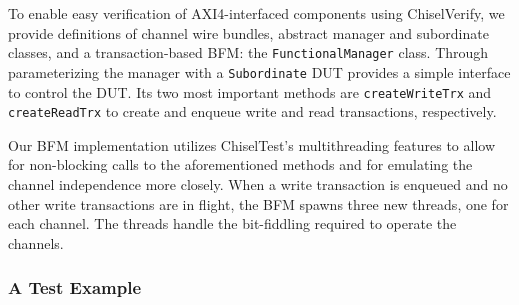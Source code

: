 \documentclass[conference]{IEEEtran}
\begin{document}
To enable easy verification of AXI4-interfaced components using ChiselVerify, we provide definitions of channel wire bundles, abstract manager and subordinate classes, and a transaction-based BFM: the \texttt{FunctionalManager} class. Through parameterizing the manager with a \texttt{Subordinate} DUT provides a simple interface to control the DUT. Its two most important methods are \texttt{createWriteTrx} and \texttt{createReadTrx} to create and enqueue write and read transactions, respectively.


Our BFM implementation utilizes ChiselTest's multithreading features to allow for non-blocking calls to the aforementioned methods and for emulating the channel independence more closely. When a write transaction is enqueued and no other write transactions are in flight, the BFM spawns three new threads, one for each channel. The threads handle the bit-fiddling required to operate the channels.

\subsubsection{A Test Example}
\end{document}
